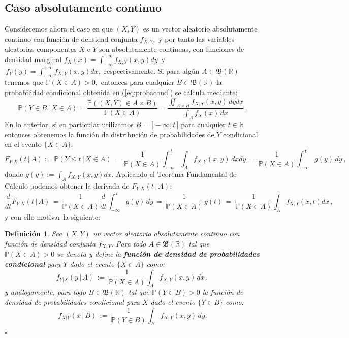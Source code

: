 \documentclass[spanish,10pt,letterpaper]{article}
\newtheorem{defi}{Definición}
\newcommand{\prob}{\mathbb{P}}
\newcommand{\Runo}{\mathbb{R}}
\newcommand{\qed}{\begin{flushright}$\square$\end{flushright}}
\begin{document}
\subsection{Caso absolutamente continuo}

Consideremos ahora el caso en que $(X,Y)$ es un vector aleatorio absolutamente continuo con función de densidad conjunta $f_{X,Y},$ y por tanto las variables aleatorias componentes $X$ e $Y$ son absolutamente continuas, con funciones de densidad marginal $f_X(x)=\int_{-\infty}^{+\infty}f_{X,Y}(x,y)dy\,$ y $\,f_Y(y)=\int_{-\infty}^{+\infty}f_{X,Y}(x,y)dx,$ respectivamente. Si para algún $A\in\mathfrak{B}(\Runo)$ tenemos que $\prob(X\in A)>0,$ entonces para cualquier $B\in\mathfrak{B}(\Runo)$ la probabilidad condicional obtenida en (\ref{eq:probacond}) se calcula mediante:
\begin{equation}\label{eq:probacond3}
    \prob(Y\in B\,|\,X\in A) = \frac{\prob((X,Y)\in A\times B)}{\prob(X\in A)} = \frac{\iint_{A\times B}f_{X,Y}(x,y)\,dydx}{\int_A f_X(x)\,dx}\,.
\end{equation}
En lo anterior, si en particular utilizamos $B=\,]-\infty,t\,]$ para cualquier $t\in\Runo$ entonces obtenemos la función de distribución de probabilidades de $Y$ condicional en el evento $\{X\in A\}:$
\begin{equation}\label{eq:probacond4}
    F_{Y|X}(t\,|\,A) := \prob(Y\leq t\,|\,X\in A) \,=\,\frac{1}{\prob(X\in A)}\int_{-\infty}^{\,t}\int_A f_{X,Y}(x,y)\,dxdy \,=\, \frac{1}{\prob(X\in A)}\int_{-\infty}^{\,t}g(y)\,dy\,,
\end{equation}
donde $g(y):=\int_A f_{X,Y}(x,y)dx.$ Aplicando el Teorema Fundamental de Cálculo podemos obtener la derivada de $F_{Y|X}(t\,|\,A):$
$$\frac{d}{dt}F_{Y|X}(t\,|\,A) \,=\, \frac{1}{\prob(X\in A)}\frac{d}{dt}\int_{-\infty}^{\,t}g(y)\,dy\,=\, \frac{1}{\prob(X\in A)}\,g(t) \,=\, \frac{1}{\prob(X\in A)}\int_A f_{X,Y}(x,t)dx\,,$$
y con ello motivar la siguiente:

\bigskip 

\begin{defi}\label{def:fdpcond}
    Sea $(X,Y)$ un vector aleatorio absolutamente continuo con función de densidad conjunta $f_{X,Y}.$ Para todo $A\in\mathfrak{B}(\Runo)$ tal que $\prob(X\in A)>0$ se denota y define la \textbf{función de densidad de probabilidades condicional} para $Y$ dado el evento $\{X\in A\}$ como:
    $$f_{Y|X}(y\,|\,A) \,:=\, \frac{1}{\prob(X\in A)}\int_A f_{X,Y}(x,y)\,dx\,,$$
    y análogamente, para todo $B\in\mathfrak{B}(\Runo)$ tal que $\prob(Y\in B)>0$ la función de densidad de probabilidades condicional para $X$ dado el evento $\{Y\in B\}$ como:
    $$f_{X|Y}(x\,|\,B) \,:=\, \frac{1}{\prob(Y\in B)}\int_B f_{X,Y}(x,y)\,dy.$$ \qed
\end{defi}
\end{document}
